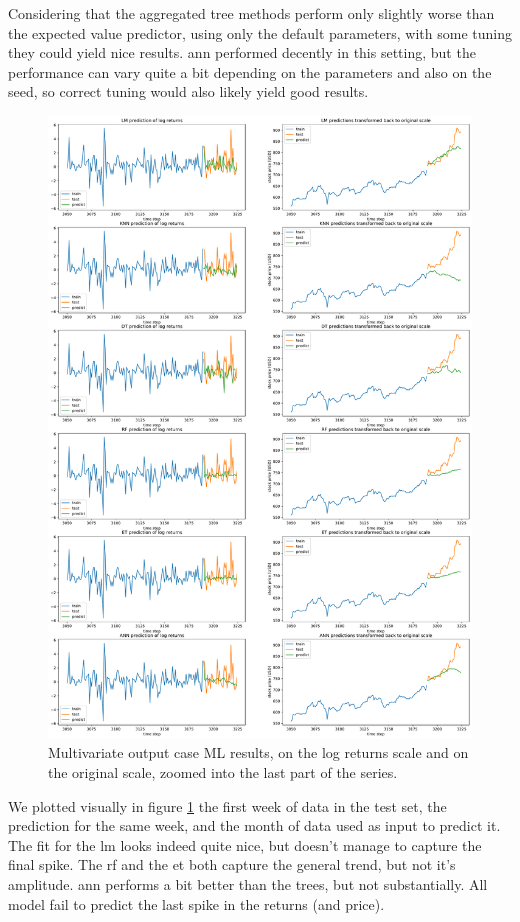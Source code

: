 Considering that the aggregated tree methods perform only slightly worse than the expected value predictor, using only the default parameters,  with some tuning they could yield nice results. \acrshort{ann} performed decently in this setting, but the performance can vary quite a bit depending on the parameters and also on the seed, so correct tuning would also likely yield good results.

\begin{figure}
	\centering
	\includegraphics[width=\textwidth]{img/img_mlresults_v2.pdf}
	\caption{Multivariate output case ML results, on the log returns scale and on the original scale, zoomed into the last part of the series.}
	\label{fig:mlresults_v2}
\end{figure}

We plotted visually in figure \ref{fig:mlresults_v2} the first week of data in the test set, the prediction for the same week, and the month of data used as input to predict it. The fit for the \acrshort{lm} looks indeed quite nice, but doesn't manage to capture the final spike.
The \acrlong{rf} and the \acrlong{et} both capture the general trend, but not it's amplitude. \acrshort{ann} performs a bit better than the trees, but not substantially. All model fail to predict the last spike in the returns (and price).